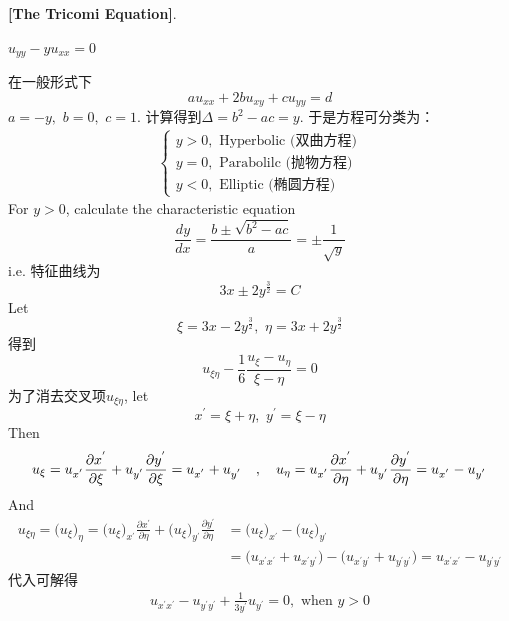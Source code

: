 	\begin{example}\label{ex 2.2.1}
		\textbf{[The Tricomi Equation]}. 
		\begin{center}
			$u_{yy} - y u_{xx} = 0$
		\end{center}
		
		\vspace*{2em}
		
		\begin{solution}
			在一般形式下
			\[ au_{xx} + 2b u_{xy} + c u_{yy} = d \]
			$a = -y , \,\, b = 0 , \,\, c = 1$. 计算得到$\Delta = b^2 - ac = y$. 于是方程可分类为：
			\begin{align*}
				\begin{cases}
					y > 0 , \,\, \text{Hyperbolic (双曲方程)} \\
					y = 0 , \,\, \text{Parabolilc (抛物方程)} \\
					y < 0 , \,\, \text{Elliptic (椭圆方程)}
				\end{cases}
			\end{align*}
			For $y > 0$, calculate the characteristic equation
			\[ \frac{dy}{dx} = \frac{b \pm \sqrt{b^2 - ac}}{a} = \pm \frac{1}{\sqrt{y}} \]
			i.e. 特征曲线为
			\[ 3x \pm 2y^{\tfrac{3}{2}} = C \]
			Let 
			\[ \xi = 3x - 2y^{\tfrac{3}{2}} , \,\, \eta = 3x + 2y^{\tfrac{3}{2}} \]
			得到
			\[ u_{\xi\eta} - \frac{1}{6} \frac{u_{\xi} - u_{\eta}}{\xi - \eta} = 0 \]
			为了消去交叉项$u_{\xi\eta}$, let
			\[ x^{'} = \xi + \eta , \,\, y^{'} = \xi - \eta \]
			Then
			\begin{align*}
				u_{\xi} = u_{x^{'}} \frac{\partial x^{'}}{\partial \xi} + u_{y^{'}} \frac{\partial y^{'}}{\partial \xi} = u_{x^{'}} + u_{y^{'}} 
				\hspace*{1em} , \hspace*{1em}
				u_{\eta} = u_{x^{'}} \frac{\partial x^{'}}{\partial \eta} + u_{y^{'}} \frac{\partial y^{'}}{\partial \eta} = u_{x^{'}} - u_{y^{'}}
			\end{align*}
			And
			\begin{align*}
				u_{\xi\eta} 
				= \Big( u_{\xi} \Big)_{\eta} 
				= \Big( u_{\xi} \Big)_{x^{'}} \frac{\partial x^{'}}{\partial \eta} + \Big( u_{\xi} \Big)_{y^{'}} \frac{\partial y^{'}}{\partial \eta} 
				&= \Big( u_{\xi} \Big)_{x^{'}} - \Big( u_{\xi} \Big)_{y^{'}} \\
				&= \Big( u_{x^{'}x^{'}} + u_{x^{'}y^{'}} \Big) - \Big( u_{x^{'}y^{'}} + u_{y^{'}y^{'}} \Big) 
				= u_{x^{'}x^{'}} - u_{y^{'}y^{'}}
			\end{align*}
			代入可解得
			\begin{align*}
				u_{x^{'}x^{'}} - u_{y^{'}y^{'}} + \frac{1}{3y^{'}} u_{y^{'}} = 0 , \,\, \text{when} \,\,  y > 0
			\end{align*}
		\end{solution}
	\end{example}

